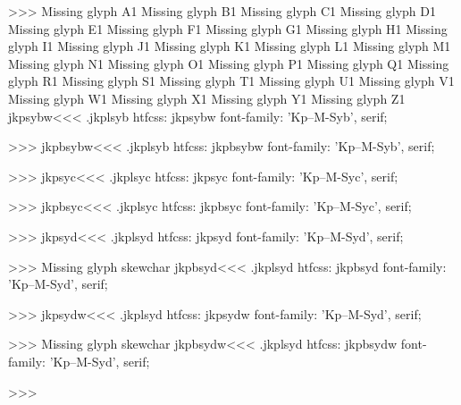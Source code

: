 >>>
Missing glyph	A1
Missing glyph	B1
Missing glyph	C1
Missing glyph	D1
Missing glyph	E1
Missing glyph	F1
Missing glyph	G1
Missing glyph	H1
Missing glyph	I1
Missing glyph	J1
Missing glyph	K1
Missing glyph	L1
Missing glyph	M1
Missing glyph	N1
Missing glyph	O1
Missing glyph	P1
Missing glyph	Q1
Missing glyph	R1
Missing glyph	S1
Missing glyph	T1
Missing glyph	U1
Missing glyph	V1
Missing glyph	W1
Missing glyph	X1
Missing glyph	Y1
Missing glyph	Z1
\<jkpsybw\><<<
.jkplsyb
htfcss:  jkpsybw  font-family: 'Kp--M-Syb', serif;

>>>
\<jkpbsybw\><<<
.jkplsyb
htfcss:  jkpbsybw  font-family: 'Kp--M-Syb', serif;

>>>
\<jkpsyc\><<<
.jkplsyc
htfcss:  jkpsyc  font-family: 'Kp--M-Syc', serif;

>>>
\<jkpbsyc\><<<
.jkplsyc
htfcss:  jkpbsyc  font-family: 'Kp--M-Syc', serif;

>>>
\<jkpsyd\><<<
.jkplsyd
htfcss:  jkpsyd  font-family: 'Kp--M-Syd', serif;

>>>
Missing glyph	skewchar
\<jkpbsyd\><<<
.jkplsyd
htfcss:  jkpbsyd  font-family: 'Kp--M-Syd', serif;

>>>
\<jkpsydw\><<<
.jkplsyd
htfcss:  jkpsydw  font-family: 'Kp--M-Syd', serif;

>>>
Missing glyph	skewchar
\<jkpbsydw\><<<
.jkplsyd
htfcss:  jkpbsydw  font-family: 'Kp--M-Syd', serif;

>>>
\bye

